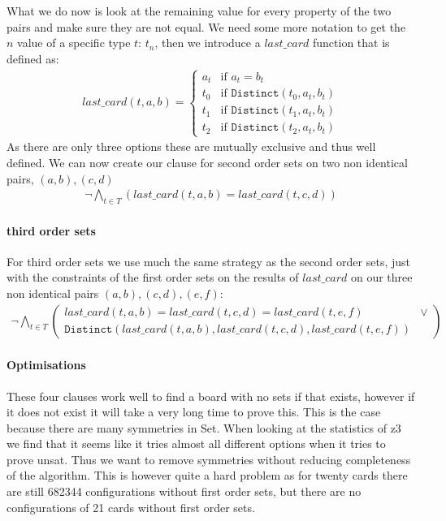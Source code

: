 \documentclass[12pt]{scrartcl}
\newcommand{\mtt}[1]{\ensuremath{\mathtt{#1}}}
\begin{document}
What we do now is look at the remaining value for every property of the two pairs and make sure they are not equal. We need some more notation to get the $n$ value of a specific type $t$: $t_n$, then we introduce a $last\_card$ function that is defined as:
\begin{align*}
    last\_card(t,a,b) = \begin{cases}
        a_t & \text{if } a_t = b_t \\
        t_0 & \text{if } \mtt{Distinct}(t_0, a_t, b_t) \\
        t_1 & \text{if } \mtt{Distinct}(t_1, a_t, b_t) \\
        t_2 & \text{if } \mtt{Distinct}(t_2, a_t, b_t)
    \end{cases}
\end{align*}
As there are only three options these are mutually exclusive and thus well defined. We can now create our clause for second order sets on two non identical pairs, $(a,b), (c,d)$
\begin{align*}
    \neg \bigwedge_{t\in T} \left(last\_card(t, a,b) = last\_card(t, c,d) \right)
\end{align*}

\paragraph{third order sets}
For third order sets we use much the same strategy as the second order sets, just with the constraints of the first order sets on the results of $last\_card$ on our three non identical pairs $(a,b), (c,d), (e,f)$:
\begin{align*}
    \neg \bigwedge_{t\in T} \left(\begin{array}{ll}
        last\_card(t,a,b) = last\_card(t,c,d) = last\_card(t,e,f) &\vee\\
        \mtt{Distinct}(last\_card(t,a,b), last\_card(t,c,d), last\_card(t,e,f))
    \end{array}
    \right)
\end{align*}

\paragraph{Optimisations}
These four clauses work well to find a board with no sets if that exists, however if it does not exist it will take a very long time to prove this. This is the case because there are many symmetries in Set. When looking at the statistics of z3 we find that it seems like it tries almost all different options when it tries to prove unsat. Thus we want to remove symmetries without reducing completeness of the algorithm. This is however quite a hard problem as for twenty cards there are still 682344 configurations without first order sets, but there are no configurations of 21 cards without first order sets\cite{Davis2003TheCG}.
\end{document}

